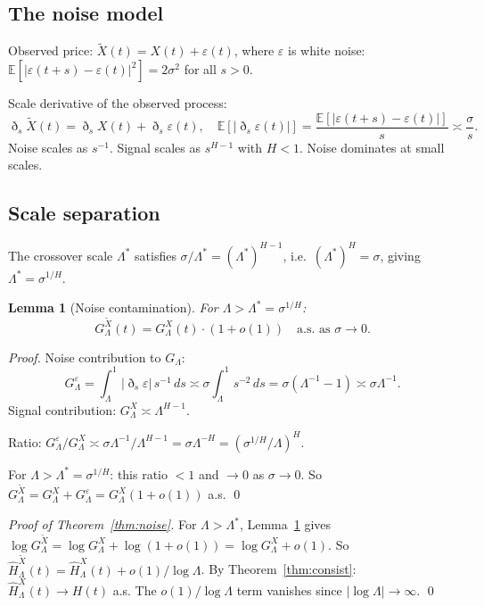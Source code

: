 \documentclass[11pt,a4paper]{article}
\newtheorem{lemma}[theorem]{Lemma}
\theoremstyle{definition}
\theoremstyle{remark}
\newcommand{\E}{\mathbb{E}}
\newcommand{\GL}{G_\Lambda}
\begin{document}
\subsection{The noise model}

Observed price: $\tilde X(t)=X(t)+\varepsilon(t)$, where $\varepsilon$
is white noise: $\E[|\varepsilon(t+s)-\varepsilon(t)|^2]=2\sigma^2$
for all $s>0$.

Scale derivative of the observed process:
\[
  \eth_s\tilde X(t) = \eth_s X(t)+\eth_s\varepsilon(t),\quad
  \E[|\eth_s\varepsilon(t)|]
  = \frac{\E[|\varepsilon(t+s)-\varepsilon(t)|]}{s}
  \asymp\frac{\sigma}{s}.
\]
Noise scales as $s^{-1}$. Signal scales as $s^{H-1}$ with $H<1$.
Noise dominates at small scales.

\subsection{Scale separation}

The crossover scale $\Lambda^*$ satisfies $\sigma/\Lambda^*=(\Lambda^*)^{H-1}$,
i.e.\ $(\Lambda^*)^H=\sigma$, giving $\Lambda^*=\sigma^{1/H}$.

\begin{lemma}[Noise contamination]\label{lem:noise}
For $\Lambda>\Lambda^*=\sigma^{1/H}$:
\[
  G_\Lambda^{\tilde X}(t) = G_\Lambda^X(t)\cdot(1+o(1))
  \quad\text{a.s.\ as }\sigma\to0.
\]
\end{lemma}

\begin{proof}
Noise contribution to $\GL$:
\[
  G_\Lambda^\varepsilon = \int_\Lambda^1|\eth_s\varepsilon|\,s^{-1}\,ds
  \asymp\sigma\int_\Lambda^1 s^{-2}\,ds = \sigma(\Lambda^{-1}-1)
  \asymp\sigma\Lambda^{-1}.
\]
Signal contribution: $G_\Lambda^X\asymp\Lambda^{H-1}$.

Ratio: $G_\Lambda^\varepsilon/G_\Lambda^X\asymp\sigma\Lambda^{-1}/\Lambda^{H-1}
=\sigma\Lambda^{-H}=(\sigma^{1/H}/\Lambda)^H$.

For $\Lambda>\Lambda^*=\sigma^{1/H}$: this ratio $<1$ and $\to0$ as
$\sigma\to0$. So $G_\Lambda^{\tilde X}=G_\Lambda^X+G_\Lambda^\varepsilon
=G_\Lambda^X(1+o(1))$ a.s. \qed
\end{proof}

\begin{proof}[Proof of Theorem~\ref{thm:noise}]
For $\Lambda>\Lambda^*$, Lemma~\ref{lem:noise} gives
$\log G_\Lambda^{\tilde X}=\log G_\Lambda^X+\log(1+o(1))=
\log G_\Lambda^X+o(1)$.
So $\hat H_\Lambda^{\tilde X}(t)=\hat H_\Lambda^X(t)+o(1)/\log\Lambda$.
By Theorem~\ref{thm:consist}: $\hat H_\Lambda^X(t)\to H(t)$ a.s.
The $o(1)/\log\Lambda$ term vanishes since $|\log\Lambda|\to\infty$. \qed
\end{proof}
\end{document}
